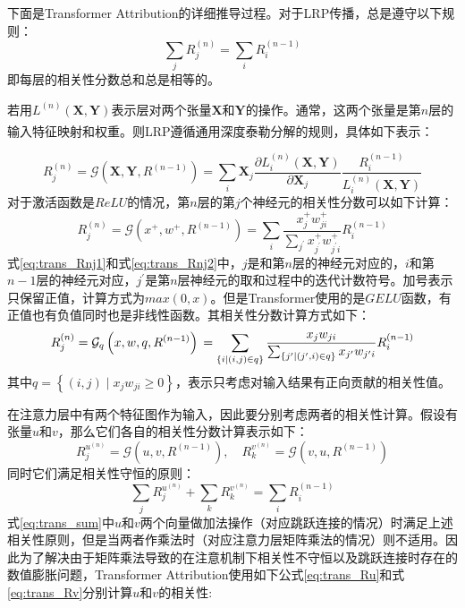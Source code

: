 下面是Transformer Attribution的详细推导过程。对于LRP传播，总是遵守以下规则：
\begin{equation}
	\sum_{j} R_{j}^{(n)}=\sum_{i} R_{i}^{(n-1)}
\end{equation}
即每层的相关性分数总和总是相等的。


若用$L^{(n)}(\mathbf{X},\mathbf{Y})$表示层对两个张量$\mathbf{X}$和$\mathbf{Y}$的操作。通常，这两个张量是第$n$层的输入特征映射和权重。则LRP遵循通用深度泰勒分解\textsuperscript{\cite{montavon2017explaining}}的规则，具体如下表示：

\begin{equation}
	R_{j}^{(n)} =\mathcal{G}\left(\mathbf{X}, \mathbf{Y}, R^{(n-1)}\right) =\sum_{i} \mathbf{X}_{j} \frac{\partial L_{i}^{(n)}(\mathbf{X}, \mathbf{Y})}{\partial \mathbf{X}_{j}} \frac{R_{i}^{(n-1)}}{L_{i}^{(n)}(\mathbf{X}, \mathbf{Y})}
	\label{eq:trans_Rnj1}
\end{equation}
对于激活函数是$ReLU$的情况，第$n$层的第$j$个神经元的相关性分数可以如下计算：
\begin{equation}
	R_{j}^{(n)}=\mathcal{G}\left(x^{+}, w^{+}, R^{(n-1)}\right)=\sum_{i} \frac{x_{j}^{+} w_{j i}^{+}}{\sum_{j^{\prime}} x_{j^{\prime}}^{+} w_{j^{\prime} i}^{+}} R_{i}^{(n-1)}
	\label{eq:trans_Rnj2}
\end{equation}
式\ref{eq:trans_Rnj1}和式\ref{eq:trans_Rnj2}中，$j$是和第$n$层的神经元对应的，$i$和第$n-1$层的神经元对应，$j^{\prime}$是第$n$层神经元的取和过程中的迭代计数符号。加号表示只保留正值，计算方式为$max(0,x)$。但是Transformer使用的是$GELU$函数，有正值也有负值同时也是非线性函数。其相关性分数计算方式如下：
\begin{equation}
	R_{j}^{(n)}  =\mathcal{G}_{q}\left(x, w, q, R^{(n-1)}\right) \\
	 =\sum_{\{i \mid(i, j) \in q\}} \frac{x_{j} w_{j i}}{\sum_{\{j^{\prime} \mid\left(j^{\prime}, i\right) \in q\}} x_{j^{\prime}} w_{j^{\prime} i}} R_{i}^{(n-1)}
\end{equation}
其中$q=\left\{(i, j) \mid x_{j} w_{j i} \geq 0\right\}$，表示只考虑对输入结果有正向贡献的相关性值。

在注意力层中有两个特征图作为输入，因此要分别考虑两者的相关性计算。假设有张量$u$和$v$，那么它们各自的相关性分数计算表示如下：
\begin{equation}
	R_{j}^{u^{(n)}}=\mathcal{G}\left(u, v, R^{(n-1)}\right), \quad R_{k}^{v^{(n)}}=\mathcal{G}\left(v, u, R^{(n-1)}\right)
\end{equation}
同时它们满足相关性守恒的原则：
\begin{equation}
	\sum_j R_{j}^{u^{(n)}}+ \sum_k R_{k}^{v^{(n)}}=\sum_i R_{i}^{(n-1)}
	\label{eq:trans_sum}
\end{equation}
式\ref{eq:trans_sum}中$u$和$v$两个向量做加法操作（对应跳跃连接的情况）时满足上述相关性原则，但是当两者作乘法时（对应注意力层矩阵乘法的情况）则不适用。因此为了解决由于矩阵乘法导致的在注意机制下相关性不守恒以及跳跃连接时存在的数值膨胀问题，Transformer Attribution使用如下公式\ref{eq:trans_Ru}和式\ref{eq:trans_Rv}分别计算$u$和$v$的相关性:

